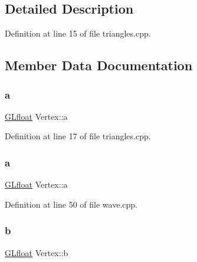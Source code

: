 \subsection{Detailed Description}


Definition at line 15 of file triangles.\+cpp.



\subsection{Member Data Documentation}
\mbox{\label{struct_vertex_a885e6834f58550a4e1c1339a171f42f2}} 
\subsubsection{\texorpdfstring{a}{a}\hspace{0.1cm}{\footnotesize\ttfamily [1/2]}}
{\footnotesize\ttfamily \mbox{\hyperlink{glad_8h_a836cf6377099e88abf24c255b5b0ac52}{G\+Lfloat}} Vertex\+::a}



Definition at line 17 of file triangles.\+cpp.

\mbox{\label{struct_vertex_a885e6834f58550a4e1c1339a171f42f2}} 
\subsubsection{\texorpdfstring{a}{a}\hspace{0.1cm}{\footnotesize\ttfamily [2/2]}}
{\footnotesize\ttfamily \mbox{\hyperlink{glad_8h_a836cf6377099e88abf24c255b5b0ac52}{G\+Lfloat}} Vertex\+::a}



Definition at line 50 of file wave.\+cpp.

\mbox{\label{struct_vertex_a0a5270835c4e3bcce9bfc9ba4a069bbb}} 
\subsubsection{\texorpdfstring{b}{b}\hspace{0.1cm}{\footnotesize\ttfamily [1/2]}}
{\footnotesize\ttfamily \mbox{\hyperlink{glad_8h_a836cf6377099e88abf24c255b5b0ac52}{G\+Lfloat}} Vertex\+::b}



